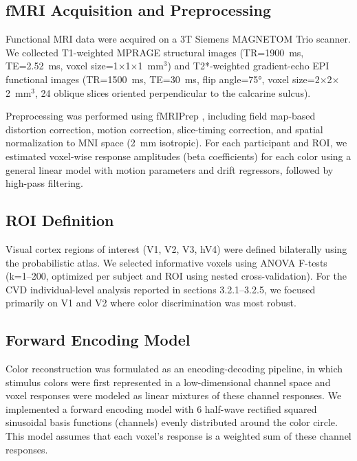 \documentclass[12pt,a4paper]{article}
\begin{document}
\subsection{fMRI Acquisition and Preprocessing}

Functional MRI data were acquired on a 3T Siemens MAGNETOM Trio scanner. We collected T1-weighted MPRAGE structural images (TR=1900~ms, TE=2.52~ms, voxel size=1$\times$1$\times$1~mm$^3$) and T2*-weighted gradient-echo EPI functional images (TR=1500~ms, TE=30~ms, flip angle=75°, voxel size=2$\times$2$\times$2~mm$^3$, 24 oblique slices oriented perpendicular to the calcarine sulcus).

Preprocessing was performed using fMRIPrep \parencite{Esteban2019}, including field map-based distortion correction, motion correction, slice-timing correction, and spatial normalization to MNI space (2~mm isotropic). For each participant and ROI, we estimated voxel-wise response amplitudes (beta coefficients) for each color using a general linear model with motion parameters and drift regressors, followed by high-pass filtering.

\subsection{ROI Definition}

Visual cortex regions of interest (V1, V2, V3, hV4) were defined bilaterally using the \textcite{Wang2015} probabilistic atlas. We selected informative voxels using ANOVA F-tests (k=1--200, optimized per subject and ROI using nested cross-validation). For the CVD individual-level analysis reported in sections 3.2.1--3.2.5, we focused primarily on V1 and V2 where color discrimination was most robust.

\subsection{Forward Encoding Model}

Color reconstruction was formulated as an encoding-decoding pipeline, in which stimulus colors were first represented in a low-dimensional channel space and voxel responses were modeled as linear mixtures of these channel responses. We implemented a forward encoding model \parencite{Brouwer2009} with 6 half-wave rectified squared sinusoidal basis functions (channels) evenly distributed around the color circle. This model assumes that each voxel's response is a weighted sum of these channel responses.
\end{document}
